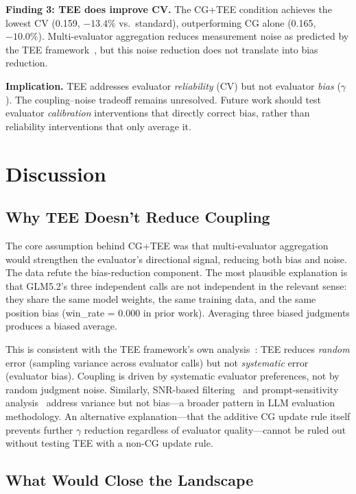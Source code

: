 \documentclass[11pt]{article}
\begin{document}
\textbf{Finding 3: TEE does improve CV.} The CG+TEE condition achieves the lowest CV (0.159, $-13.4\%$ vs.\ standard), outperforming CG alone (0.165, $-10.0\%$). Multi-evaluator aggregation reduces measurement noise as predicted by the TEE framework~\cite{messing2026tee}, but this noise reduction does not translate into bias reduction.

\textbf{Implication.} TEE addresses evaluator \textit{reliability} (CV) but not evaluator \textit{bias} ($\gamma$). The coupling--noise tradeoff remains unresolved. Future work should test evaluator \textit{calibration} interventions that directly correct bias, rather than reliability interventions that only average it.

\section{Discussion}

\subsection{Why TEE Doesn't Reduce Coupling}

The core assumption behind CG+TEE was that multi-evaluator aggregation would strengthen the evaluator's directional signal, reducing both bias and noise. The data refute the bias-reduction component. The most plausible explanation is that GLM5.2's three independent calls are not independent in the relevant sense: they share the same model weights, the same training data, and the same position bias (win\_rate = 0.000 in prior work). Averaging three biased judgments produces a biased average.

This is consistent with the TEE framework's own analysis~\cite{messing2026tee}: TEE reduces \textit{random} error (sampling variance across evaluator calls) but not \textit{systematic} error (evaluator bias). Coupling is driven by systematic evaluator preferences, not by random judgment noise. Similarly, SNR-based filtering~\cite{heineman2025snr} and prompt-sensitivity analysis~\cite{sclar2024quantifying} address variance but not bias---a broader pattern in LLM evaluation methodology. An alternative explanation---that the additive CG update rule itself prevents further $\gamma$ reduction regardless of evaluator quality---cannot be ruled out without testing TEE with a non-CG update rule.

\subsection{What Would Close the Landscape}
\end{document}
